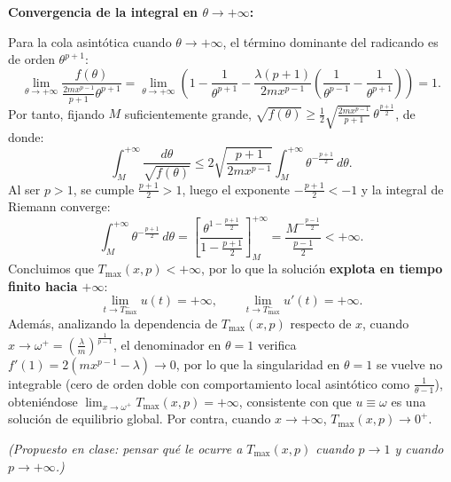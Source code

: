 {\begin{itemize}
        \textbf{Convergencia de la integral en $\theta \to +\infty$:}
        
        Para la cola asintótica cuando $\theta \to +\infty$, el término dominante del radicando es de orden $\theta^{p+1}$:
        \[
            \lim_{\theta \to +\infty} \frac{f(\theta)}{\frac{2m x^{p-1}}{p+1}\theta^{p+1}} = \lim_{\theta \to +\infty} \left(1 - \frac{1}{\theta^{p+1}} - \frac{\lambda(p+1)}{2mx^{p-1}}\left(\frac{1}{\theta^{p-1}} - \frac{1}{\theta^{p+1}}\right)\right) = 1.
        \]
        Por tanto, fijando $M$ suficientemente grande, $\sqrt{f(\theta)} \ge \frac{1}{2}\sqrt{\frac{2m x^{p-1}}{p+1}}\,\theta^{\frac{p+1}{2}}$, de donde:
        \[
            \int_M^{+\infty} \frac{d\theta}{\sqrt{f(\theta)}} \le 2\sqrt{\frac{p+1}{2mx^{p-1}}} \int_M^{+\infty} \theta^{-\frac{p+1}{2}}\,d\theta.
        \]
        Al ser $p > 1$, se cumple $\frac{p+1}{2} > 1$, luego el exponente $-\frac{p+1}{2} < -1$ y la integral de Riemann converge:
        \[
            \int_M^{+\infty} \theta^{-\frac{p+1}{2}}\,d\theta = \left[\frac{\theta^{1 - \frac{p+1}{2}}}{1 - \frac{p+1}{2}}\right]_M^{+\infty} = \frac{M^{-\frac{p-1}{2}}}{\frac{p-1}{2}} < +\infty.
        \]
        Concluimos que $T_{\max}(x, p) < +\infty$, por lo que la solución \textbf{explota en tiempo finito hacia $+\infty$}:
        \[
            \lim_{t \to T_{\max}^-} u(t) = +\infty, \qquad \lim_{t \to T_{\max}^-} u'(t) = +\infty.
        \]
        Además, analizando la dependencia de $T_{\max}(x, p)$ respecto de $x$, cuando $x \to \omega^+ = \left(\frac{\lambda}{m}\right)^{\frac{1}{p-1}}$, el denominador en $\theta = 1$ verifica $f'(1) = 2(mx^{p-1} - \lambda) \to 0$, por lo que la singularidad en $\theta = 1$ se vuelve no integrable (cero de orden doble con comportamiento local asintótico como $\frac{1}{\theta-1}$), obteniéndose $\lim_{x \to \omega^+} T_{\max}(x, p) = +\infty$, consistente con que $u \equiv \omega$ es una solución de equilibrio global. Por contra, cuando $x \to +\infty$, $T_{\max}(x, p) \to 0^+$.

        \begin{center}
        \end{center}

        \textit{(Propuesto en clase: pensar qué le ocurre a $T_{\max}(x, p)$ cuando $p \to 1$ y cuando $p \to +\infty$.)}
    \end{itemize}
}

